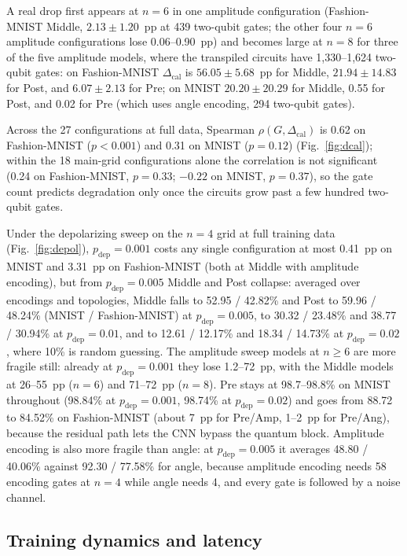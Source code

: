 \documentclass{ieeeaccess}
\newcommand{\pdep}{p_{\mathrm{dep}}}           %
\newcommand{\Dcal}{\Delta_{\mathrm{cal}}}
\begin{document}
A real drop first appears at $n = 6$ in one amplitude configuration (Fashion-MNIST Middle, $2.13 \pm 1.20$~pp at 439 two-qubit gates; the other four $n = 6$ amplitude configurations lose 0.06--0.90~pp) and becomes large at $n = 8$ for three of the five amplitude models, where the transpiled circuits have 1,330--1,624 two-qubit gates: on Fashion-MNIST $\Dcal$ is $56.05 \pm 5.68$~pp for Middle, $21.94 \pm 14.83$ for Post, and $6.07 \pm 2.13$ for Pre; on MNIST $20.20 \pm 20.29$ for Middle, 0.55 for Post, and 0.02 for Pre (which uses angle encoding, 294 two-qubit gates).

Across the 27 configurations at full data, Spearman $\rho(G, \Dcal)$ is 0.62 on Fashion-MNIST ($p < 0.001$) and 0.31 on MNIST ($p = 0.12$) (Fig.~\ref{fig:dcal}); within the 18 main-grid configurations alone the correlation is not significant (0.24 on Fashion-MNIST, $p = 0.33$; $-0.22$ on MNIST, $p = 0.37$), so the gate count predicts degradation only once the circuits grow past a few hundred two-qubit gates.

Under the depolarizing sweep on the $n = 4$ grid at full training data (Fig.~\ref{fig:depol}), $\pdep = 0.001$ costs any single configuration at most 0.41~pp on MNIST and 3.31~pp on Fashion-MNIST (both at Middle with amplitude encoding), but from $\pdep = 0.005$ Middle and Post collapse: averaged over encodings and topologies, Middle falls to 52.95 / 42.82\% and Post to 59.96 / 48.24\% (MNIST / Fashion-MNIST) at $\pdep = 0.005$, to 30.32 / 23.48\% and 38.77 / 30.94\% at $\pdep = 0.01$, and to 12.61 / 12.17\% and 18.34 / 14.73\% at $\pdep = 0.02$, where 10\% is random guessing. The amplitude sweep models at $n \geq 6$ are more fragile still: already at $\pdep = 0.001$ they lose 1.2--72~pp, with the Middle models at 26--55~pp ($n = 6$) and 71--72~pp ($n = 8$). Pre stays at 98.7--98.8\% on MNIST throughout (98.84\% at $\pdep = 0.001$, 98.74\% at $\pdep = 0.02$) and goes from 88.72 to 84.52\% on Fashion-MNIST (about 7~pp for Pre/Amp, 1--2~pp for Pre/Ang), because the residual path lets the CNN bypass the quantum block. Amplitude encoding is also more fragile than angle: at $\pdep = 0.005$ it averages 48.80 / 40.06\% against 92.30 / 77.58\% for angle, because amplitude encoding needs 58 encoding gates at $n = 4$ while angle needs 4, and every gate is followed by a noise channel.

\subsection{Training dynamics and latency}
\label{sec:res-latency}
\end{document}
